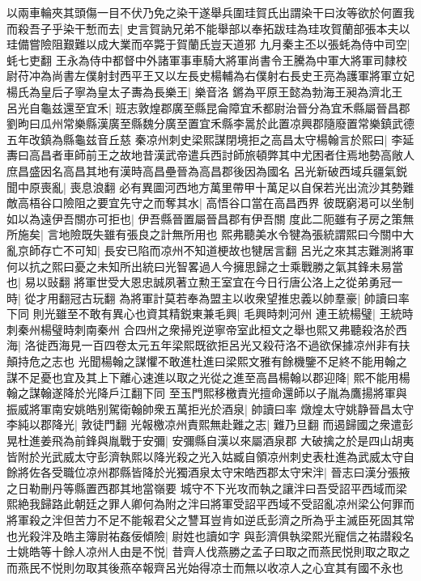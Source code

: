 以兩車輪夾其頭傷一目不伏乃免之染干遂舉兵圍珪賀氏出謂染干曰汝等欲於何置我而殺吾子乎染干慙而去|{
	史言賀訥兄弟不能舉部以奉拓跋珪為珪攻賀蘭部張本夫以珪備嘗險阻艱難以成大業而卒斃于賀蘭氏豈天道邪}
九月秦主丕以張蚝為侍中司空|{
	蚝七吏翻}
王永為侍中都督中外諸軍事車騎大將軍尚書令王騰為中軍大將軍司隸校尉苻冲為尚書左僕射封西平王又以左長史楊輔為右僕射右長史王亮為護軍將軍立妃楊氏為皇后子寧為皇太子夀為長樂王|{
	樂音洛}
鏘為平原王懿為勃海王昶為濟北王　呂光自龜兹還至宜禾|{
	班志敦煌郡廣至縣昆侖障宜禾都尉治晉分為宜禾縣屬晉昌郡劉昫曰瓜州常樂縣漢廣至縣魏分廣至置宜禾縣李暠於此置凉興郡隨廢置常樂鎮武德五年改鎮為縣龜兹音丘慈}
秦凉州刺史梁熙謀閉境拒之高昌太守楊翰言於熙曰|{
	李延夀曰高昌者車師前王之故地昔漢武帝遣兵西討師旅頓弊其中尤困者住焉地勢高敞人庶昌盛因名高昌其地有漢時高昌壘晉為高昌郡後因為國名}
呂光新破西域兵疆氣鋭聞中原喪亂|{
	喪息浪翻}
必有異圖河西地方萬里帶甲十萬足以自保若光出流沙其勢難敵高梧谷口險阻之要宜先守之而奪其水|{
	高悟谷口當在高昌西界}
彼既窮渇可以坐制如以為遠伊吾關亦可拒也|{
	伊吾縣晉置屬晉昌郡有伊吾關}
度此二阨雖有子房之策無所施矣|{
	言地險既失雖有張良之計無所用也}
熙弗聽美水令犍為張統謂熙曰今關中大亂京師存亡不可知|{
	長安已陷而凉州不知道梗故也犍居言翻}
呂光之來其志難測將軍何以抗之熙曰憂之未知所出統曰光智畧過人今擁思歸之士乘戰勝之氣其鋒未易當也|{
	易以䜴翻}
將軍世受大恩忠誠夙著立勲王室宜在今日行唐公洛上之從弟勇冠一時|{
	從才用翻冠古玩翻}
為將軍計莫若奉為盟主以收衆望推忠義以帥羣豪|{
	帥讀曰率下同}
則光雖至不敢有異心也資其精鋭東兼毛興|{
	毛興時刺河州}
連王統楊璧|{
	王統時刺秦州楊璧時刺南秦州}
合四州之衆掃兇逆寧帝室此桓文之舉也熙又弗聽殺洛於西海|{
	洛徙西海見一百四卷太元五年梁熙既欲拒呂光又殺苻洛不過欲保據凉州非有扶顛持危之志也}
光聞楊翰之謀懼不敢進杜進曰梁熙文雅有餘機鑒不足終不能用翰之謀不足憂也宜及其上下離心速進以取之光從之進至高昌楊翰以郡迎降|{
	熙不能用楊翰之謀翰遂降於光降戶江翻下同}
至玉門熙移檄責光擅命還師以子胤為鷹揚將軍與振威將軍南安姚皓别駕衛翰帥衆五萬拒光於酒泉|{
	帥讀曰率}
燉煌太守姚静晉昌太守李純以郡降光|{
	敦徒門翻}
光報檄凉州責熙無赴難之志|{
	難乃旦翻}
而遏歸國之衆遣彭晃杜進姜飛為前鋒與胤戰于安彌|{
	安彌縣自漢以來屬酒泉郡}
大破擒之於是四山胡夷皆附於光武威太守彭濟執熙以降光殺之光入姑臧自領凉州刺史表杜進為武威太守自餘將佐各受職位凉州郡縣皆降於光獨酒泉太守宋皓西郡太守宋泮|{
	晉志曰漢分張掖之日勒刪丹等縣置西郡其地當嶺要}
城守不下光攻而執之讓泮曰吾受詔平西域而梁熙絶我歸路此朝廷之罪人卿何為附之泮曰將軍受詔平西域不受詔亂凉州梁公何罪而將軍殺之泮但苦力不足不能報君父之讐耳豈肯如逆氐彭濟之所為乎主滅臣死固其常也光殺泮及皓主簿尉祐姦佞傾險|{
	尉姓也讀如字}
與彭濟俱執梁熙光寵信之祐譛殺名士姚皓等十餘人凉州人由是不悦|{
	昔齊人伐燕勝之孟子曰取之而燕民悦則取之取之而燕民不悦則勿取其後燕卒報齊呂光始得凉士而無以收凉人之心宜其有國不永也}
